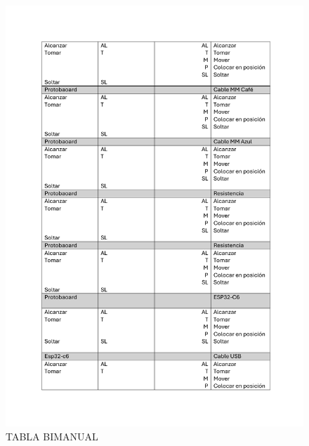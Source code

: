     \begin{figure}[H]
        \centering
        \includegraphics[trim = {20mm 82mm 20mm 25mm},clip,scale=0.45]{9/Img/tablaBimanualDos.pdf}
        \caption{TABLA BIMANUAL }
        \label{fig:bimanual}
    \end{figure}
